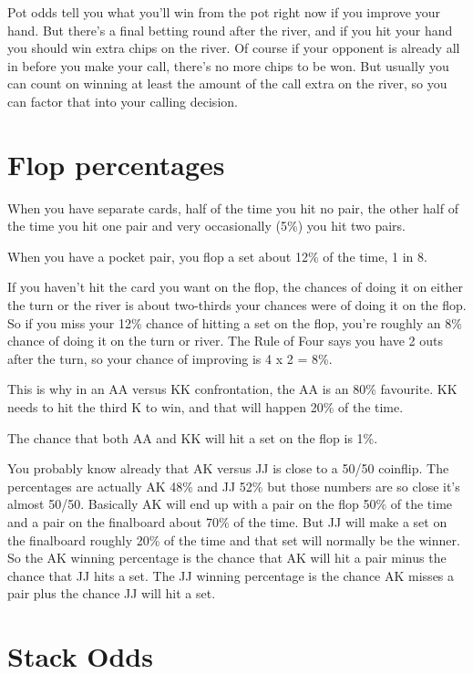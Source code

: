 Pot odds tell you what you'll win from the pot right now if you
improve your hand. But there's a final betting round after the river,
and if you hit your hand you should win extra chips on the river. Of
course if your opponent is already all in before you make your call,
there's no more chips to be won. But usually you can count on winning
at least the amount of the call extra on the river, so you can factor
that into your calling decision.

\section{Flop percentages}

When you have separate cards, half of the time you hit no pair, the
other half of the time you hit one pair and very occasionally (5\%)
you hit two pairs.

When you have a pocket pair, you flop a set about 12\% of the time, 1
in 8.

If you haven't hit the card you want on the flop, the chances of doing
it on either the turn or the river is about two-thirds your
chances were of doing it on the flop. So if you miss your 12\% chance
of hitting a set on the flop, you're roughly an 8\% chance of doing it
on the turn or river. The Rule of Four says you have 2 outs after the
turn, so your chance of improving is 4 x 2 = 8\%.

This is why in an AA versus KK confrontation, the AA is an 80\%
favourite. KK needs to hit the third K to win, and that will happen
20\% of the time.

The chance that both AA and KK will hit a set on the flop is 1\%.

You probably know already that AK versus JJ is close to a 50/50 coinflip.
The percentages are actually AK 48\% and JJ 52\% but those numbers are so
close it's almost 50/50. Basically AK will end up with a pair on the
flop 50\% of the time and a pair on the finalboard about 70\% of the
time. But JJ will make a set on the finalboard roughly 20\% of the time and
that set will normally be the winner. So the AK winning percentage is the
chance that AK will hit a pair minus the chance that JJ hits a set.
The JJ winning percentage is the chance AK misses a pair plus the
chance JJ will hit a set.

\section{Stack Odds}


